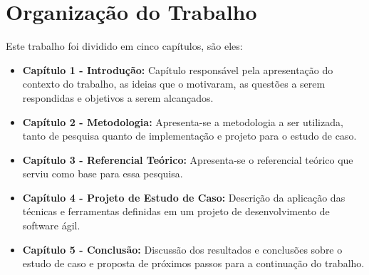 \section{Organização do Trabalho}
Este trabalho foi dividido em cinco capítulos, são eles:

\begin{itemize}
    \item \textbf{Capítulo 1 - Introdução:} Capítulo responsável pela apresentação do contexto do trabalho, as ideias que o motivaram, as questões a serem respondidas e objetivos a serem alcançados.
    \item \textbf{Capítulo 2 - Metodologia:} Apresenta-se a metodologia a ser utilizada, tanto de pesquisa quanto de implementação e projeto para o estudo de caso.
    \item \textbf{Capítulo 3 - Referencial Teórico:} Apresenta-se o referencial teórico que serviu como base para essa pesquisa.
    \item \textbf{Capítulo 4 - Projeto de Estudo de Caso:} Descrição da aplicação das técnicas e ferramentas definidas em um projeto de desenvolvimento de software ágil.
    \item \textbf{Capítulo 5 - Conclusão:} Discussão dos resultados e conclusões sobre o estudo de caso e proposta de próximos passos para a continuação do trabalho.
\end{itemize}

